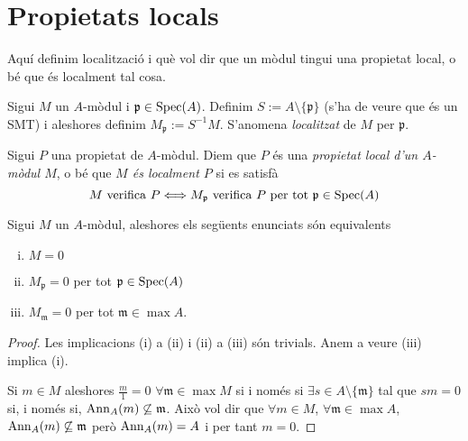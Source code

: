\documentclass[../../../main.tex]{subfiles}
\begin{document}
\section{Propietats locals}


Aquí definim localització i què vol dir que un mòdul tingui una propietat local, o bé que és localment tal cosa.

\begin{defi}
[Localitzat]\label{def:localitzat} Sigui $M$ un $A$-mòdul i $\mathfrak{p}\in\mathrm{Spec}(A)$. Definim $S:=A\setminus \{\mathfrak{p}\}$ (s'ha de veure que és un SMT) i aleshores definim $M_\mathfrak{p}:=S^{-1}M$. S'anomena \textit{localitzat} de $M$ per $\mathfrak{p}$.
\end{defi}

\begin{defi}
\label{def:propietatLocal} Sigui $P$ una propietat de $A$-mòdul. Diem que $P$ és una \textit{propietat local d'un $A$-mòdul $M$}, o bé que \textit{$M$ és localment $P$} si es satisfà
\begin{equation}
    \notag
    \text{$M$ verifica $P$} \Longleftrightarrow \text{$M_\mathfrak{p}$ verifica $P$ per tot $\mathfrak{p}\in\mathrm{Spec}(A)$}
\end{equation}
\end{defi}

\begin{prop}
\label{prop:propietatLocal} Sigui $M$ un $A$-mòdul, aleshores els següents enunciats són equivalents
\begin{enumerate}[(i)]
    \item $M = 0$
    \item $M_\mathfrak{p} = 0$ per tot $\mathfrak{p}\in\mathrm{Spec}(A)$
    \item $M_\mathfrak{m} = 0$ per tot $\mathfrak{m}\in\max A$.
\end{enumerate}
\end{prop}
\begin{proof}
Les implicacions (i) a (ii) i (ii) a (iii) són trivials. Anem a veure (iii) implica (i).

Si $m\in M$ aleshores $\frac{m}{1} = 0$ $\forall \mathfrak{m}\in\max M$ si i només si $\exists s\in A\setminus\{\mathfrak{m}\}$ tal que $sm = 0$ si, i només si, $\operatorname{Ann}_A(m)\not\subseteq\mathfrak{m}$. Això vol dir que $\forall m\in M$, $\forall \mathfrak{m}\in\max A$, $\operatorname{Ann}_A(m)\not\subseteq \mathfrak{m}$ però $\operatorname{Ann}_A(m) = A$ i per tant $m = 0$.
\end{proof}
\end{document}

